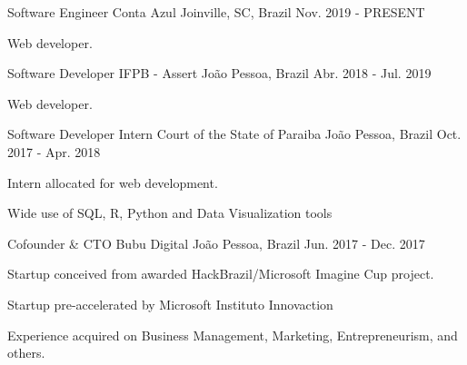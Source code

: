 

\begin{cventries}

  \cventry
    {Software Engineer} %
    {Conta Azul} %
    {Joinville, SC, Brazil} %
    {Nov. 2019 - PRESENT} %
    {
      \begin{cvitems} %
        \item {Web developer.}
      \end{cvitems}
    }
    
  \cventry
    {Software Developer} %
    {IFPB - Assert} %
    {João Pessoa, Brazil} %
    {Abr. 2018 - Jul. 2019} %
    {
      \begin{cvitems} %
        \item {Web developer.}
      \end{cvitems}
    }
    
  \cventry
    {Software Developer Intern} %
    {Court of the State of Paraiba} %
    {João Pessoa, Brazil} %
    {Oct. 2017 - Apr. 2018} %
    {
      \begin{cvitems} %
        \item {Intern allocated for web development.}
        \item {Wide use of SQL, R, Python and Data Visualization tools}
      \end{cvitems}
    }
    
      \cventry
        {Cofounder \& CTO} %
        {Bubu Digital} %
        {João Pessoa, Brazil} %
        {Jun. 2017 - Dec. 2017} %
        {
          \begin{cvitems} %
            \item {Startup conceived from awarded HackBrazil/Microsoft Imagine Cup project.}
            \item {Startup pre-accelerated by Microsoft Instituto Innovaction}
            \item {Experience acquired on Business Management, Marketing, Entrepreneurism, and others.}
          \end{cvitems}
        }
        

\end{cventries}
